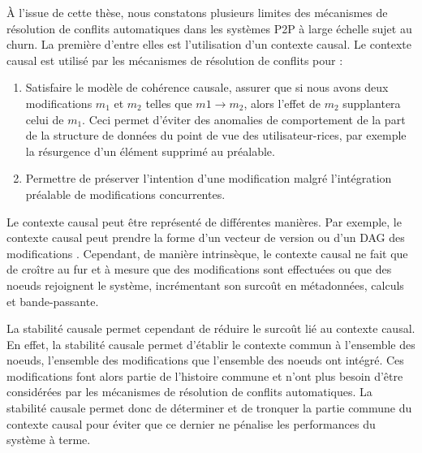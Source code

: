 \label{sec:manual-merge}

À l'issue de cette thèse, nous constatons plusieurs limites des mécanismes de résolution de conflits automatiques dans les systèmes \ac{P2P} à large échelle sujet au churn.
La première d'entre elles est l'utilisation d'un contexte causal.
Le contexte causal est utilisé par les mécanismes de résolution de conflits pour :
\begin{enumerate}
    \item Satisfaire le modèle de cohérence causale, \ie assurer que si nous avons deux modifications $m_1$ et $m_2$ telles que $m1 \to m_2$, alors l'effet de $m_2$ supplantera celui de $m_1$.
        Ceci permet d'éviter des anomalies de comportement de la part de la structure de données du point de vue des utilisateur-rices, par exemple la résurgence d'un élément supprimé au préalable.
    \item Permettre de préserver l'intention d'une modification malgré l'intégration préalable de modifications concurrentes.
\end{enumerate}


Le contexte causal peut être représenté de différentes manières.
Par exemple, le contexte causal peut prendre la forme d'un vecteur de version \cite{1988-version-vector-mattern,1991-version-vector-fidge} ou d'un \ac{DAG} des modifications \cite{1997-causal-barrier}.
Cependant, de manière intrinsèque, le contexte causal ne fait que de croître au fur et à mesure que des modifications sont effectuées ou que des noeuds rejoignent le système, incrémentant son surcoût en métadonnées, calculs et bande-passante.

La stabilité causale permet cependant de réduire le surcoût lié au contexte causal.
En effet, la stabilité causale permet d'établir le contexte commun à l'ensemble des noeuds, \ie l'ensemble des modifications que l'ensemble des noeuds ont intégré.
Ces modifications font alors partie de l'histoire commune et n'ont plus besoin d'être considérées par les mécanismes de résolution de conflits automatiques.
La stabilité causale permet donc de déterminer et de tronquer la partie commune du contexte causal pour éviter que ce dernier ne pénalise les performances du système à terme.\\

